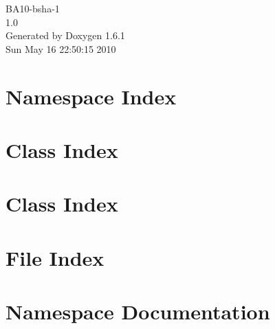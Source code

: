 \documentclass[a4paper]{book}
\begin{document}
\hypersetup{pageanchor=false}
\begin{titlepage}
\vspace*{7cm}
\begin{center}
{\Large BA10-\/bsha-\/1 \\[1ex]\large 1.0 }\\
\vspace*{1cm}
{\large Generated by Doxygen 1.6.1}\\
\vspace*{0.5cm}
{\small Sun May 16 22:50:15 2010}\\
\end{center}
\end{titlepage}
\clearemptydoublepage
{}
\tableofcontents
\clearemptydoublepage
{}
\hypersetup{pageanchor=true}
\chapter{Namespace Index}

\chapter{Class Index}

\chapter{Class Index}

\chapter{File Index}

\chapter{Namespace Documentation}







\end{document}
